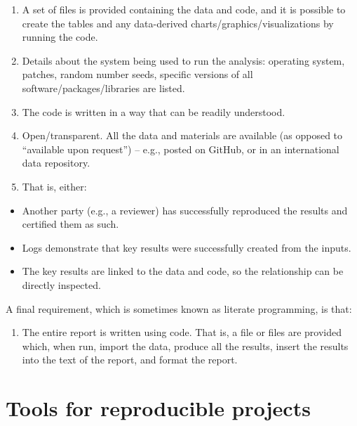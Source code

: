 \documentclass[
  12pt,
]{book}
\providecommand{\tightlist}{%
  \setlength{\itemsep}{0pt}\setlength{\parskip}{0pt}}
\begin{document}
\begin{enumerate}
\def\labelenumi{\alph{enumi})}
\item
  A set of files is provided containing the data and code, and it is possible to create the tables and any data-derived charts/graphics/visualizations by running the code.
\item
  Details about the system being used to run the analysis: operating system, patches, random number seeds, specific versions of all software/packages/libraries are listed.
\item
  The code is written in a way that can be readily understood.
\item
  Open/transparent. All the data and materials are available (as opposed to ``available upon request'') -- e.g., posted on GitHub, or in an international data repository.
\item
  That is, either:
\end{enumerate}

\begin{itemize}
\tightlist
\item
  Another party (e.g., a reviewer) has successfully reproduced the results and certified them as such.\\
\item
  Logs demonstrate that key results were successfully created from the inputs.\\
\item
  The key results are linked to the data and code, so the relationship can be directly inspected.
\end{itemize}

A final requirement, which is sometimes known as literate programming, is that:

\begin{enumerate}
\def\labelenumi{\alph{enumi})}
\setcounter{enumi}{5}
\tightlist
\item
  The entire report is written using code. That is, a file or files are provided which, when run, import the data, produce all the results, insert the results into the text of the report, and format the report.
\end{enumerate}

\hypertarget{tools-for-reproducible-projects}{%
\chapter{Tools for reproducible projects}\label{tools-for-reproducible-projects}}
\end{document}
